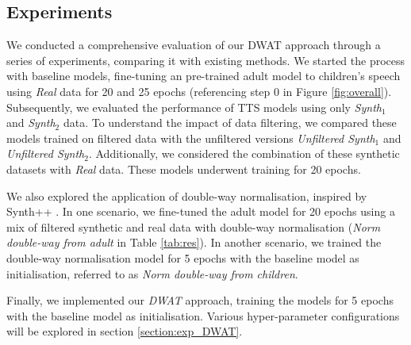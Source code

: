 \subsection{Experiments}
We conducted a comprehensive evaluation of our DWAT approach through a series of experiments, comparing it with existing methods. We started the process with baseline models, fine-tuning an pre-trained adult model to children's speech using \textit{Real} data for 20 and 25 epochs (referencing step 0 in Figure \ref{fig:overall}). Subsequently, we evaluated the performance of TTS models using only \textit{Synth$_1$} and \textit{Synth$_2$} data. To understand the impact of data filtering, we compared these models trained on filtered data with the unfiltered versions \textit{Unfiltered Synth$_1$} and \textit{Unfiltered Synth$_2$}. Additionally, we considered the combination of these synthetic datasets with \textit{Real} data. These models underwent training for 20 epochs.

We also explored the application of double-way normalisation, inspired by Synth++ \cite{hu2022synt++}. In one scenario, we fine-tuned the adult model for 20 epochs using a mix of filtered synthetic and real data with double-way normalisation (\textit{Norm double-way from adult} in Table \ref{tab:res}). In another scenario, we trained the double-way normalisation model for 5 epochs with the baseline model as initialisation, referred to as \textit{Norm double-way from children}.

Finally, we implemented our \textit{DWAT} approach, training the models for 5 epochs with the baseline model as initialisation. Various hyper-parameter configurations will be explored in section \ref{section:exp_DWAT}.

